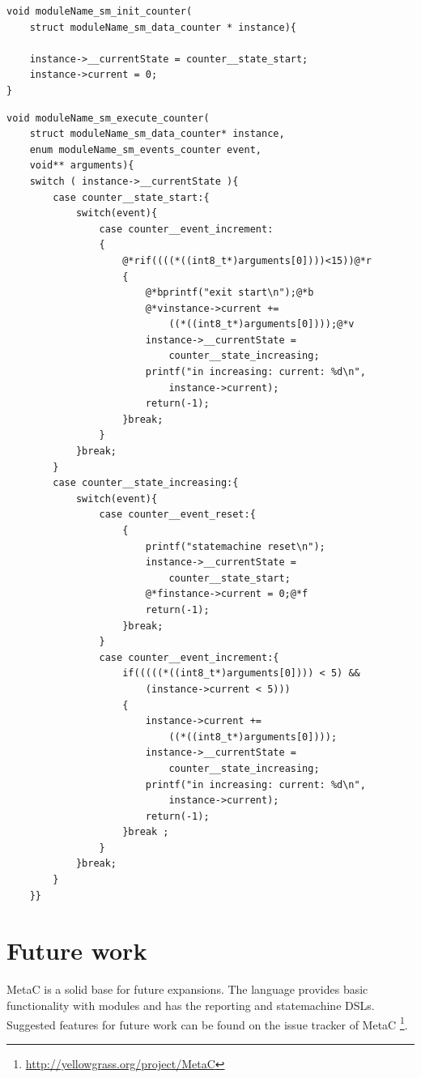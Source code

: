 \documentclass[a4paper,10pt,titlepage]{report}
\begin{document}
\begin{lstlisting}
void moduleName_sm_init_counter(
    struct moduleName_sm_data_counter * instance){

    instance->__currentState = counter__state_start;
    instance->current = 0;
}
\end{lstlisting}    
\newpage
\begin{lstlisting}
void moduleName_sm_execute_counter(
    struct moduleName_sm_data_counter* instance, 
    enum moduleName_sm_events_counter event, 
    void** arguments){
    switch ( instance->__currentState ){
        case counter__state_start:{
            switch(event){
                case counter__event_increment:
                {
                    @*rif((((*((int8_t*)arguments[0])))<15))@*r
                    {
                        @*bprintf("exit start\n");@*b
                        @*vinstance->current += 
                            ((*((int8_t*)arguments[0])));@*v
                        instance->__currentState = 
                            counter__state_increasing;
                        printf("in increasing: current: %d\n", 
                            instance->current);
                        return(-1);
                    }break;
                }
            }break;
        }
        case counter__state_increasing:{    
            switch(event){
                case counter__event_reset:{
                    {
                        printf("statemachine reset\n");
                        instance->__currentState = 
                            counter__state_start;
                        @*finstance->current = 0;@*f
                        return(-1);
                    }break;
                }
                case counter__event_increment:{
                    if(((((*((int8_t*)arguments[0]))) < 5) && 
                        (instance->current < 5)))
                    {
                        instance->current +=
                            ((*((int8_t*)arguments[0])));
                        instance->__currentState = 
                            counter__state_increasing;
                        printf("in increasing: current: %d\n",
                            instance->current);
                        return(-1);
                    }break ;
                }
            }break;
        }
    }}
\end{lstlisting}

\chapter{Future work}
MetaC is a solid base for future expansions. The language provides basic functionality with modules and has the reporting and statemachine DSLs. Suggested features for future work can be found on the issue tracker of MetaC \footnote{\url{http://yellowgrass.org/project/MetaC}}.
\end{document}
